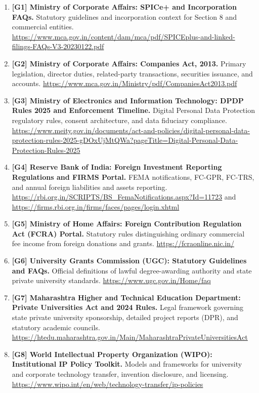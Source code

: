 \begin{enumerate}
    \item \textbf{[G1] Ministry of Corporate Affairs: SPICe+ and Incorporation FAQs.} Statutory guidelines and incorporation context for Section 8 and commercial entities. \url{https://www.mca.gov.in/content/dam/mca/pdf/SPICEplus-and-linked-filings-FAQs-V3-20230122.pdf}
    \item \textbf{[G2] Ministry of Corporate Affairs: Companies Act, 2013.} Primary legislation, director duties, related-party transactions, securities issuance, and accounts. \url{https://www.mca.gov.in/Ministry/pdf/CompaniesAct2013.pdf}
    \item \textbf{[G3] Ministry of Electronics and Information Technology: DPDP Rules 2025 and Enforcement Timeline.} Digital Personal Data Protection regulatory rules, consent architecture, and data fiduciary compliance. \url{https://www.meity.gov.in/documents/act-and-policies/digital-personal-data-protection-rules-2025-gDOxUjMtQWa?pageTitle=Digital-Personal-Data-Protection-Rules-2025}
    \item \textbf{[G4] Reserve Bank of India: Foreign Investment Reporting Regulations and FIRMS Portal.} FEMA notifications, FC-GPR, FC-TRS, and annual foreign liabilities and assets reporting. \url{https://rbi.org.in/SCRIPTS/BS_FemaNotifications.aspx?Id=11723} and \url{https://firms.rbi.org.in/firms/faces/pages/login.xhtml}
    \item \textbf{[G5] Ministry of Home Affairs: Foreign Contribution Regulation Act (FCRA) Portal.} Statutory rules distinguishing ordinary commercial fee income from foreign donations and grants. \url{https://fcraonline.nic.in/}
    \item \textbf{[G6] University Grants Commission (UGC): Statutory Guidelines and FAQs.} Official definitions of lawful degree-awarding authority and state private university standards. \url{https://www.ugc.gov.in/Home/faq}
    \item \textbf{[G7] Maharashtra Higher and Technical Education Department: Private Universities Act and 2024 Rules.} Legal framework governing state private university sponsorship, detailed project reports (DPR), and statutory academic councils. \url{https://htedu.maharashtra.gov.in/Main/MaharashtraPrivateUniversitiesAct}
    \item \textbf{[G8] World Intellectual Property Organization (WIPO): Institutional IP Policy Toolkit.} Models and frameworks for university and corporate technology transfer, invention disclosure, and licensing. \url{https://www.wipo.int/en/web/technology-transfer/ip-policies}

\end{enumerate}
